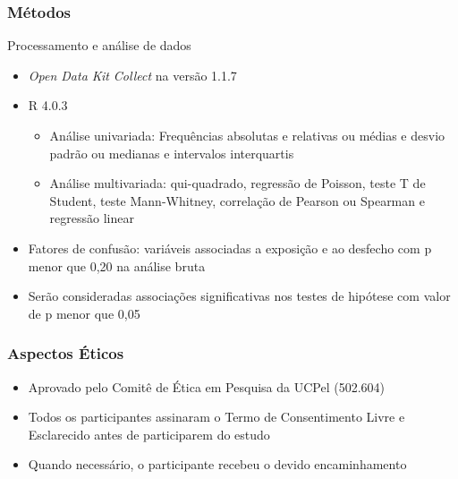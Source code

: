 \documentclass{beamer}
\begin{document}
\begin{frame}
\frametitle{Métodos}

    \begin{block}{Processamento e análise de dados}
        \begin{itemize}
            \item \emph{Open Data Kit Collect} na versão 1.1.7       
            \item R 4.0.3
            \begin{itemize}
                \item Análise univariada: Frequências absolutas e relativas ou
                médias e desvio padrão ou medianas e intervalos interquartis
                \item Análise multivariada: qui-quadrado, regressão de Poisson,
                teste T de Student, teste Mann-Whitney, correlação de Pearson
                ou Spearman e regressão linear
            \end{itemize}
            \item Fatores de confusão: variáveis associadas a exposição e ao
            desfecho com p menor que 0,20 na análise bruta
            \item Serão consideradas associações significativas nos testes de
            hipótese com valor de p menor que 0,05
        \end{itemize}
    \end{block}

\end{frame}

\begin{frame}
\frametitle{Aspectos Éticos}

    \Large
    \begin{itemize}

        \item Aprovado pelo Comitê de Ética em Pesquisa da UCPel (502.604)

        \item Todos os participantes assinaram o Termo de Consentimento Livre
        e Esclarecido antes de participarem do estudo

        \item Quando necessário, o participante recebeu o devido encaminhamento

    \end{itemize}

\end{frame}
\end{document}
